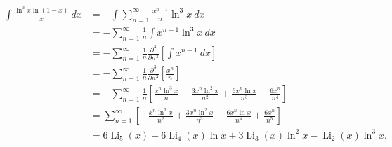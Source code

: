 \begin{align}
\int\frac{\ln^3x\ln (1-x)}{x}\ dx&=-\int\sum_{n=1}^\infty \frac{x^{n-1}}{n}\ln^3x\ dx\\
&=-\sum_{n=1}^\infty \frac{1}{n}\int x^{n-1}\ln^3x\ dx\\
&=-\sum_{n=1}^\infty \frac{1}{n}\frac{\partial^3}{\partial n^3}\left[\int x^{n-1}\ dx\right]\\
&=-\sum_{n=1}^\infty \frac{1}{n}\frac{\partial^3}{\partial n^3}\left[\frac{x^{n}}{n}\right]\\
&=-\sum_{n=1}^\infty \frac{1}{n}\left[\frac{x^{n}\ln^3x}{n}-\frac{3x^{n}\ln^2x}{n^2}+\frac{6x^{n}\ln x}{n^3}-\frac{6x^{n}}{n^4}\right]\\
&=\sum_{n=1}^\infty \left[-\frac{x^{n}\ln^3x}{n^2}+\frac{3x^{n}\ln^2x}{n^3}-\frac{6x^{n}\ln x}{n^4}+\frac{6x^{n}}{n^5}\right]\\
&=6\operatorname{Li}_5(x)-6\operatorname{Li}_4(x)\ln x+3\operatorname{Li}_3(x)\ln^2x-\operatorname{Li}_2(x)\ln^3x.
\end{align}